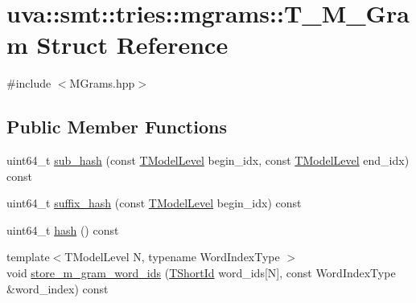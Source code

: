 \hypertarget{structuva_1_1smt_1_1tries_1_1mgrams_1_1_t___m___gram}{}\section{uva\+:\+:smt\+:\+:tries\+:\+:mgrams\+:\+:T\+\_\+\+M\+\_\+\+Gram Struct Reference}
\label{structuva_1_1smt_1_1tries_1_1mgrams_1_1_t___m___gram}


{\ttfamily \#include $<$M\+Grams.\+hpp$>$}

\subsection*{Public Member Functions}
\begin{DoxyCompactItemize}
\item 
uint64\+\_\+t \hyperlink{structuva_1_1smt_1_1tries_1_1mgrams_1_1_t___m___gram_a87d9852f45d1302d444d3b675ac208ee}{sub\+\_\+hash} (const \hyperlink{namespaceuva_1_1smt_1_1tries_a20577a44b3a42d26524250634379b7cb}{T\+Model\+Level} begin\+\_\+idx, const \hyperlink{namespaceuva_1_1smt_1_1tries_a20577a44b3a42d26524250634379b7cb}{T\+Model\+Level} end\+\_\+idx) const 
\item 
uint64\+\_\+t \hyperlink{structuva_1_1smt_1_1tries_1_1mgrams_1_1_t___m___gram_ad881b8fd36556fe70d67eeea21a0c878}{suffix\+\_\+hash} (const \hyperlink{namespaceuva_1_1smt_1_1tries_a20577a44b3a42d26524250634379b7cb}{T\+Model\+Level} begin\+\_\+idx) const 
\item 
uint64\+\_\+t \hyperlink{structuva_1_1smt_1_1tries_1_1mgrams_1_1_t___m___gram_a59fec2addc530f943801a49a44e64fa9}{hash} () const 
\item 
{\footnotesize template$<$T\+Model\+Level N, typename Word\+Index\+Type $>$ }\\void \hyperlink{structuva_1_1smt_1_1tries_1_1mgrams_1_1_t___m___gram_a02588e28db792891161cef79e57f34ee}{store\+\_\+m\+\_\+gram\+\_\+word\+\_\+ids} (\hyperlink{namespaceuva_1_1smt_1_1hashing_adcf22e1982ad09d3a63494c006267469}{T\+Short\+Id} word\+\_\+ids\mbox{[}N\mbox{]}, const Word\+Index\+Type \&word\+\_\+index) const 
\end{DoxyCompactItemize}
